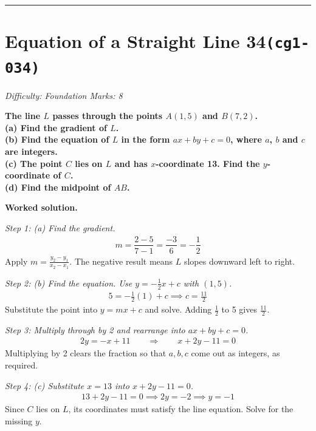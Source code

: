 \documentclass[11pt]{article}
\newcommand{\question}[1]{\par\medskip\noindent\textbf{#1}\par}
\begin{document}
\medskip\hrule

\section*{Equation of a Straight Line 34\quad\small\texttt{(cg1-034)}}
\textit{Difficulty: Foundation \quad\textbar\quad Marks: 8}

\question{The line \( L \) passes through the points \( A(1, 5) \) and \( B(7, 2) \). \\[3pt] (a) Find the gradient of \( L \). \\[3pt] (b) Find the equation of \( L \) in the form \( ax + by + c = 0 \), where \( a \), \( b \) and \( c \) are integers. \\[3pt] (c) The point \( C \) lies on \( L \) and has \( x \)-coordinate 13. Find the \( y \)-coordinate of \( C \). \\[3pt] (d) Find the midpoint of \( AB \).}

\textbf{Worked solution.}

\textit{Step 1: (a) Find the gradient.}
\[\begin{gathered}
m = \dfrac{2 - 5}{7 - 1} = \dfrac{-3}{6} = -\dfrac{1}{2}
\end{gathered}\]
Apply \(m = \frac{y_2 - y_1}{x_2 - x_1}\). The negative result means \(L\) slopes downward left to right.

\textit{Step 2: (b) Find the equation. Use \( y = -\frac{1}{2}x + c \) with \( (1, 5) \).}
\[\begin{gathered}
5 = -\tfrac{1}{2}(1) + c \implies c = \tfrac{11}{2}
\end{gathered}\]
Substitute the point into \(y = mx + c\) and solve. Adding \(\tfrac{1}{2}\) to 5 gives \(\tfrac{11}{2}\).

\textit{Step 3: Multiply through by 2 and rearrange into \( ax + by + c = 0 \).}
\[\begin{gathered}
2y = -x + 11 \quad\quad \Rightarrow \quad\quad x + 2y - 11 = 0
\end{gathered}\]
Multiplying by 2 clears the fraction so that \(a, b, c\) come out as integers, as required.

\textit{Step 4: (c) Substitute \( x = 13 \) into \( x + 2y - 11 = 0 \).}
\[\begin{gathered}
13 + 2y - 11 = 0 \implies 2y = -2 \implies y = -1
\end{gathered}\]
Since \(C\) lies on \(L\), its coordinates must satisfy the line equation. Solve for the missing \(y\).
\end{document}
